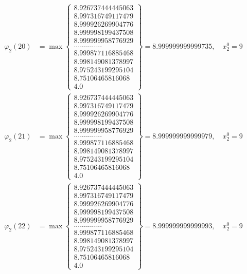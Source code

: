 \documentclass{article}
\begin{document}
\begin{align*}
  
  
  
\varphi_{2}(20) &= \max \left\{ \begin{array}{c}
8.926737444445063 \\
 8.997316749117479 \\
 8.999926269904776 \\
 8.999998199437508 \\
 8.999999958776929 \\
 .............. \\
 8.999877116885468 \\
 8.998149081378997 \\
 8.975243199295104 \\
 8.75106465816068 \\
 4.0
\end{array} \right\} = 8.999999999999735, \quad x_{2}^0 = 9\\
  
  
  
  
\varphi_{2}(21) &= \max \left\{ \begin{array}{c}
8.926737444445063 \\
 8.997316749117479 \\
 8.999926269904776 \\
 8.999998199437508 \\
 8.999999958776929 \\
 .............. \\
 8.999877116885468 \\
 8.998149081378997 \\
 8.975243199295104 \\
 8.75106465816068 \\
 4.0
\end{array} \right\} = 8.999999999999979, \quad x_{2}^0 = 9\\
  
  
  
  
\varphi_{2}(22) &= \max \left\{ \begin{array}{c}
8.926737444445063 \\
 8.997316749117479 \\
 8.999926269904776 \\
 8.999998199437508 \\
 8.999999958776929 \\
 .............. \\
 8.999877116885468 \\
 8.998149081378997 \\
 8.975243199295104 \\
 8.75106465816068 \\
 4.0
\end{array} \right\} = 8.999999999999993, \quad x_{2}^0 = 9\\
  

\end{align*}
\end{document}
